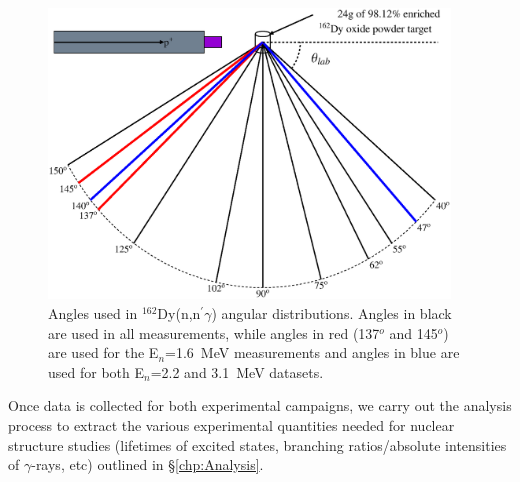 \begin{figure}[h!]
\centering
\includegraphics[width=0.95\textwidth]{SciDraw_angular_distributions.eps}
\caption{Angles used in $^{162}$Dy(n,n$^\prime\gamma$) angular distributions. Angles in black are used in all measurements, while angles in red (137$^o$ and 145$^o$) are used for the E$_n$=1.6~MeV measurements and angles in blue are used for both E$_n$=2.2 and 3.1~MeV datasets. \label{fig:SciDraw_angular_distributions}}
\end{figure}

Once data is collected for both experimental campaigns, we carry out the analysis process to extract the various experimental quantities needed for nuclear structure studies (lifetimes of excited states, branching ratios/absolute intensities of $\gamma$-rays, etc) outlined in \S \ref{chp:Analysis}.